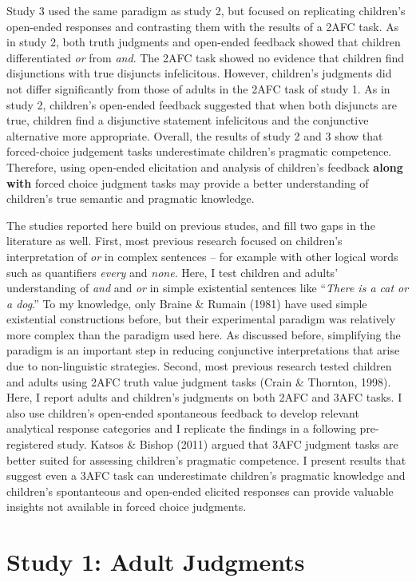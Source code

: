 \documentclass[oneside]{report}
\theoremstyle{definition}
\theoremstyle{definition}
\theoremstyle{definition}
\theoremstyle{remark}
\begin{document}
Study 3 used the same paradigm as study 2, but focused on replicating
children's open-ended responses and contrasting them with the results of
a 2AFC task. As in study 2, both truth judgments and open-ended feedback
showed that children differentiated \emph{or} from \emph{and}. The 2AFC
task showed no evidence that children find disjunctions with true
disjuncts infelicitous. However, children's judgments did not differ
significantly from those of adults in the 2AFC task of study 1. As in
study 2, children's open-ended feedback suggested that when both
disjuncts are true, children find a disjunctive statement infelicitous
and the conjunctive alternative more appropriate. Overall, the results
of study 2 and 3 show that forced-choice judgement tasks underestimate
children's pragmatic competence. Therefore, using open-ended elicitation
and analysis of children's feedback \textbf{along with} forced choice
judgment tasks may provide a better understanding of children's true
semantic and pragmatic knowledge.

The studies reported here build on previous studes, and fill two gaps in
the literature as well. First, most previous research focused on
children's interpretation of \emph{or} in complex sentences -- for
example with other logical words such as quantifiers \emph{every} and
\emph{none}. Here, I test children and adults' understanding of
\emph{and} and \emph{or} in simple existential sentences like
``\emph{There is a cat or a dog}.'' To my knowledge, only Braine \&
Rumain (1981) have used simple existential constructions before, but
their experimental paradigm was relatively more complex than the
paradigm used here. As discussed before, simplifying the paradigm is an
important step in reducing conjunctive interpretations that arise due to
non-linguistic strategies. Second, most previous research tested
children and adults using 2AFC truth value judgment tasks (Crain \&
Thornton, 1998). Here, I report adults and children's judgments on both
2AFC and 3AFC tasks. I also use children's open-ended spontaneous
feedback to develop relevant analytical response categories and I
replicate the findings in a following pre-registered study. Katsos \&
Bishop (2011) argued that 3AFC judgment tasks are better suited for
assessing children's pragmatic competence. I present results that
suggest even a 3AFC task can underestimate children's pragmatic
knowledge and children's spontanteous and open-ended elicited responses
can provide valuable insights not available in forced choice judgments.

\section{Study 1: Adult Judgments}\label{study-1-adult-judgments}
\end{document}
